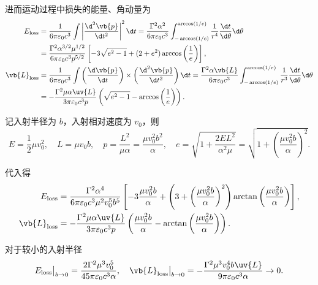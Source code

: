 \begin{example}
	进而运动过程中损失的能量、角动量为
	\begin{align*}
		E_{\text{loss}} &= \frac{1}{6\pi\varepsilon_0 c^3} \int \left| \frac{\d^2\vb{p}}{\d t^2} \right|^2 \d t = \frac{\Gamma^2 \alpha^2}{6\pi\varepsilon_0 c^3} \int_{-\arccos(1/e)}^{\arccos(1/e)} \frac{1}{r^4} \frac{\d t}{\d \theta} \d \theta \\
		&= \frac{\Gamma^2 \alpha^{3/2} \mu^{1/2}}{6\pi\varepsilon_0 c^3 p^{5/2}} \left[ -3\sqrt{e^2 - 1} + (2 + e^2)\arccos\left(\frac{1}{e}\right) \right], \\
		\vb{L}_{\text{loss}} &= \frac{1}{6\pi\varepsilon_0 c^3} \int\left(\frac{\d \vb{p}}{\d t}\right) \times \left(\frac{\d^2\vb{p}}{\d t^2}\right) \d t = \frac{\Gamma^2 \alpha \vb{L}}{6\pi\varepsilon_0 c^3} \int_{-\arccos(1/e)}^{\arccos(1/e)} \frac{1}{r^3} \frac{\d t}{\d \theta} \d \theta \\
		&= -\frac{\Gamma^2 \mu \alpha \uv{L}}{3\pi\varepsilon_0 c^3 p} \left( \sqrt{e^2 - 1} - \arccos\left(\frac{1}{e}\right) \right).
	\end{align*}

	记入射半径为 \(b\)，入射相对速度为 \(v_0\)，则
	\begin{equation*}
		E = \frac{1}{2}\mu v_0^2, \quad L = \mu v_0 b, \quad p = \frac{L^2}{\mu\alpha} = \frac{\mu v_0^2 b^2}{\alpha}, \quad e = \sqrt{1 + \frac{2 E L^2}{\alpha^2 \mu}} = \sqrt{1 + \left( \frac{\mu v_0^2 b}{\alpha} \right)^2}.
	\end{equation*}

	代入得
	\begin{align*}
		E_{\text{loss}} &= \frac{\Gamma^2 \alpha^4}{6\pi\varepsilon_0 c^3 \mu^2 v_0^5 b^5} \left[ -3\frac{\mu v_0^2 b}{\alpha} + \left( 3 + \left( \frac{\mu v_0^2 b}{\alpha} \right)^2 \right) \arctan\left( \frac{\mu v_0^2 b}{\alpha} \right) \right], \\
		\vb{L}_{\text{loss}} &= -\frac{\Gamma^2 \mu \alpha \uv{L}}{3\pi\varepsilon_0 c^3 p} \left( \frac{\mu v_0^2 b}{\alpha} - \arctan\left( \frac{\mu v_0^2 b}{\alpha} \right) \right).
	\end{align*}

	对于较小的入射半径
	\begin{equation*}
		E_{\text{loss}}\big|_{b \to 0} = \frac{2\Gamma^2 \mu^3 v_0^5}{45\pi\varepsilon_0 c^3 \alpha}, \quad \vb{L}_{\text{loss}}\big|_{b \to 0} = -\frac{\Gamma^2 \mu^3 v_0^4 b \uv{L}}{9\pi\varepsilon_0 c^3 \alpha} \to 0.
	\end{equation*}



\end{example}
